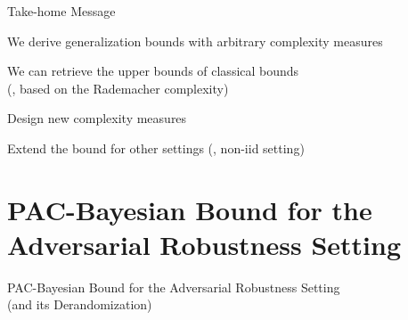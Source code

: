 \documentclass{slides}
\begin{document}
\begin{xframe}{Take-home Message}

\vspace{1cm}

\begin{xitemize}
    \item We derive generalization bounds with arbitrary complexity measures
    \item We can retrieve the upper bounds of classical bounds\\
    (\eg, based on the Rademacher complexity)
\end{xitemize}

\vspace{1cm}

\begin{xitemize}
    \item Design new complexity measures
    \item Extend the bound for other settings (\eg, non-iid setting)
\end{xitemize}

\end{xframe}


\section{PAC-Bayesian Bound for the Adversarial Robustness Setting}
\begin{xtitle}

\vspace{3.5cm}

{\huge PAC-Bayesian Bound for the Adversarial Robustness Setting}\\
{\normalsize (and its Derandomization)}

\vspace{2.5cm}

\end{xtitle}
\end{document}
